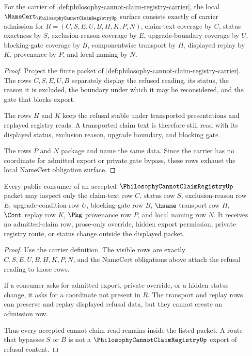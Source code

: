 \begin{theorem}
\label{thm:philosophy-cannot-claim-registry-namecert-obligations}
For the carrier of \autoref{def:philosophy-cannot-claim-registry-carrier}, the local $\NameCert_{\PhilosophyCannotClaimRegistryUp}$ surface consists exactly of carrier admission for $R=(C,S,E,U,B,H,K,P,N)$, claim-text coverage by $C$, status exactness by $S$, exclusion-reason coverage by $E$, upgrade-boundary coverage by $U$, blocking-gate coverage by $B$, componentwise transport by $H$, displayed replay by $K$, provenance by $P$, and local naming by $N$.
\end{theorem}
\begin{proof}
Project the finite packet of \autoref{def:philosophy-cannot-claim-registry-carrier}. The rows $C,S,E,U,B$ separately display the refused reading, its status, the reason it is excluded, the boundary under which it may be reconsidered, and the gate that blocks export.

The rows $H$ and $K$ keep the refusal stable under transported presentations and replayed registry reads. A transported claim text is therefore still read with its displayed status, exclusion reason, upgrade boundary, and blocking gate.

The rows $P$ and $N$ package and name the same data. Since the carrier has no coordinate for admitted export or private gate bypass, these rows exhaust the local NameCert obligation surface.
\end{proof}

\begin{theorem}
\label{thm:philosophy-cannot-claim-registry-nonescape}
Every public consumer of an accepted $\PhilosophyCannotClaimRegistryUp$ packet may inspect only the claim-text row $C$, status row $S$, exclusion-reason row $E$, upgrade-condition row $U$, blocking-gate row $B$, $\hsame$ transport row $H$, $\Cont$ replay row $K$, $\Pkg$ provenance row $P$, and local naming row $N$. It receives no admitted-claim row, prose-only override, hidden export permission, private registry route, or status change outside the displayed packet.
\end{theorem}
\begin{proof}
Use the carrier definition. The visible rows are exactly $C,S,E,U,B,H,K,P,N$, and the NameCert obligations above attach the refusal reading to those rows.

If a consumer asks for admitted export, private override, or a hidden status change, it asks for a coordinate not present in $R$. The transport and replay rows can preserve and replay displayed refusal data, but they cannot create an admission row.

Thus every accepted cannot-claim read remains inside the listed packet. A route that bypasses $S$ or $B$ is not a $\PhilosophyCannotClaimRegistryUp$ export of refusal content.
\end{proof}


